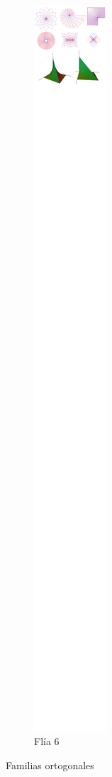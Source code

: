 \begin{figure}[t!]
~
\begin{subfigure}[t]{0.5\textwidth}
\centering
\includegraphics[scale=0.5,trim={732px 9612px 66px 374px},clip]{images/04_analisis2/am2.png}
\caption{Flía 6}
\end{subfigure}


\caption{Familias ortogonales}
\end{figure}

